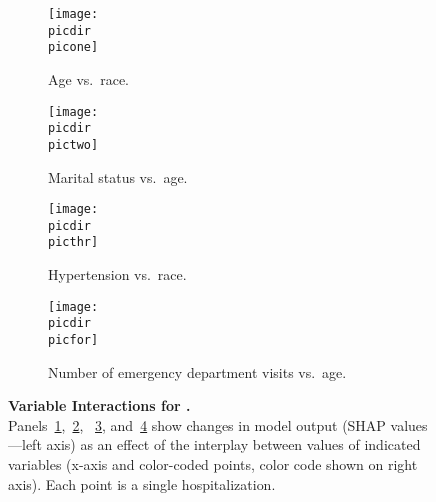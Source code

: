 \begin{figure}
\begin{adjustbox}{minipage=7.0in,frame}
\vspace{2.5mm}
\centering
%
\def\target{financialclass}
\def\targetname{Financial Class}
%
\def\picdir{supplementary/\target/}
%
\def\labbig{fig:insuranceint}
%
\def\picone{\target_SHAP_dependence_0.pdf}
\def\pictwo{\target_SHAP_dependence_1.pdf}
\def\picthr{\target_SHAP_dependence_5.pdf}
\def\picfor{\target_SHAP_dependence_7.pdf}
\def\capone{Age vs.\ race.}
\def\labone{fig:insuranceintagerace}
\def\captwo{Marital status vs.\ age.}
\def\labtwo{fig:insuranceintmarriedage}
\def\capthr{Hypertension vs.\ race.}
\def\labthr{fig:insuranceinthtnrace}
\def\capfor{Number of emergency department visits vs.\ age.}
\def\labfor{fig:insuranceintedage}
%
\def\capbig{\textbf{Variable Interactions for \titlecap{\targetname}.} \\ %
Panels~\ref{\labone},~\ref{\labtwo}, %
~\ref{\labthr}, and~\ref{\labfor} %
show changes in model output (SHAP values---left axis) %
as an effect of the interplay between %
values of indicated variables (x-axis and color-coded points, %
color code shown on right axis).\@
Each point is a single hospitalization.\@
}
%
%
\begin{subfigure}[t]{.45\linewidth}
    \centering
    \captionsetup[subfigure]{}
    \caption{\capone{}}\label{\labone}
    \texttt{[image: \\picdir\\picone]}
\end{subfigure}%
\hspace{5mm}%
\begin{subfigure}[t]{.45\linewidth}
    \centering
    \captionsetup[subfigure]{}
    \caption{\captwo}\label{\labtwo}
    \texttt{[image: \\picdir\\pictwo]}
\end{subfigure}%

\vspace{5mm}
\begin{subfigure}[t]{.45\linewidth}
    \centering
    \captionsetup[subfigure]{}
    \caption{\capthr}\label{\labthr}
    \texttt{[image: \\picdir\\picthr]}
\end{subfigure}%
\hspace{5mm}%
\begin{subfigure}[t]{.45\linewidth}
    \centering
    \captionsetup[subfigure]{}
    \caption{\capfor}\label{\labfor}
    \texttt{[image: \\picdir\\picfor]}
\end{subfigure}%

\caption{\capbig}\label{\labbig}
\end{adjustbox}
\end{figure}